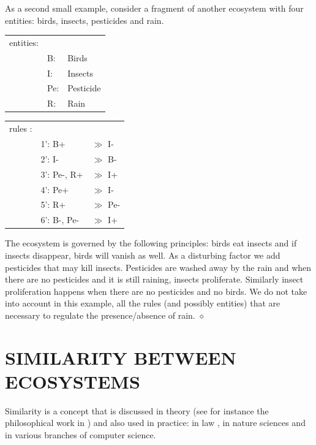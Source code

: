 \documentclass[a4paper,twoside]{article}
\begin{document}
\begin{example}[Pesticides]\label{ex:pests}
As a second small example, consider a fragment of another ecosystem with four entities: birds, insects, pesticides and rain.

\begin{table}
\centering
\begin{tabular}{lll}
entities:&&\\
    &B: &Birds \\
    &I: &Insects \\
    &Pe: &Pesticide \\
    &R: &Rain \\
\end{tabular} \qquad
\begin{tabular}{lll}
rules :&&\\
    &1': B+ & $\gg$  I-  \\
    &2': I- & $\gg$ B- \\
    &3': Pe-, R+  & $\gg$ I+ \\
    &4': Pe+ & $\gg$ I- \\
    &5': R+ & $\gg$ Pe- \\
    &6': B-, Pe- & $\gg$ I+ 
\end{tabular}
\end{table}
The ecosystem is governed by the following principles: birds eat insects and if insects disappear, birds will vanish as well. As a disturbing factor we add pesticides that may kill insects. 
Pesticides are washed away by the rain and when there are no pesticides and it is still raining, insects proliferate. Similarly insect proliferation happens when there are no pesticides and no birds. 
We do not take into account in this example, all the rules (and possibly entities) that are necessary to regulate the presence/absence of rain.
\hfill $\diamond$
\end{example}


\section{\uppercase{Similarity between ecosystems}}
\label{sec:similarity}

Similarity is a concept that is discussed in theory (see for instance the philosophical work in \cite{tversky}) and also used in practice: in law \cite{Mooiman}, in nature sciences \cite{bbw090} and in 
various branches of computer science.
\end{document}
